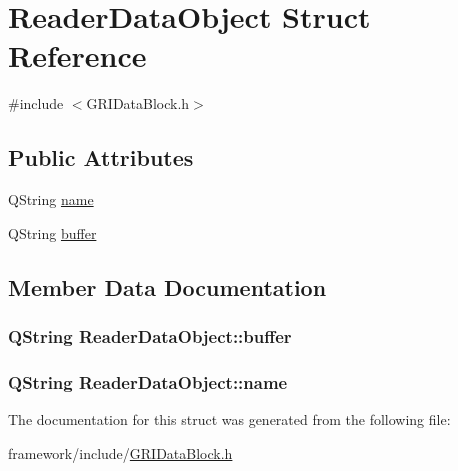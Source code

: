 \hypertarget{structReaderDataObject}{\section{\-Reader\-Data\-Object \-Struct \-Reference}
\label{structReaderDataObject}
}


{\ttfamily \#include $<$\-G\-R\-I\-Data\-Block.\-h$>$}

\subsection*{\-Public \-Attributes}
\begin{DoxyCompactItemize}
\item 
\-Q\-String \hyperlink{structReaderDataObject_a7c52e6faa3f963ba4da54f9903873d8c}{name}
\item 
\-Q\-String \hyperlink{structReaderDataObject_a161f69cecd9e9b0ee67afc42c31dc05d}{buffer}
\end{DoxyCompactItemize}


\subsection{\-Member \-Data \-Documentation}
\hypertarget{structReaderDataObject_a161f69cecd9e9b0ee67afc42c31dc05d}{
\subsubsection[{buffer}]{\setlength{\rightskip}{0pt plus 5cm}\-Q\-String {\bf \-Reader\-Data\-Object\-::buffer}}}\label{structReaderDataObject_a161f69cecd9e9b0ee67afc42c31dc05d}
\hypertarget{structReaderDataObject_a7c52e6faa3f963ba4da54f9903873d8c}{
\subsubsection[{name}]{\setlength{\rightskip}{0pt plus 5cm}\-Q\-String {\bf \-Reader\-Data\-Object\-::name}}}\label{structReaderDataObject_a7c52e6faa3f963ba4da54f9903873d8c}


\-The documentation for this struct was generated from the following file\-:\begin{DoxyCompactItemize}
\item 
framework/include/\hyperlink{GRIDataBlock_8h}{\-G\-R\-I\-Data\-Block.\-h}\end{DoxyCompactItemize}
